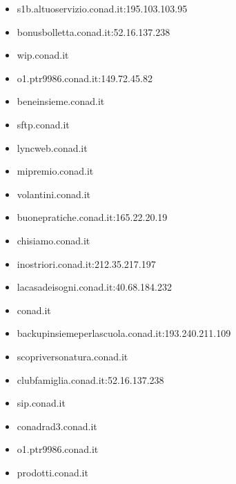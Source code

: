 \documentclass{article}
\begin{document}
\begin{itemize}
        \item s1b.altuoservizio.conad.it:195.103.103.95
    
        \item bonusbolletta.conad.it:52.16.137.238
    
        \item wip.conad.it
    
        \item o1.ptr9986.conad.it:149.72.45.82
    
        \item beneinsieme.conad.it
    
        \item sftp.conad.it
    
        \item lyncweb.conad.it
    
        \item mipremio.conad.it
    
        \item volantini.conad.it
    
        \item buonepratiche.conad.it:165.22.20.19
    
        \item chisiamo.conad.it
    
        \item inostriori.conad.it:212.35.217.197
    
        \item lacasadeisogni.conad.it:40.68.184.232
    
        \item conad.it
    
        \item backupinsiemeperlascuola.conad.it:193.240.211.109
    
        \item scopriversonatura.conad.it
    
        \item clubfamiglia.conad.it:52.16.137.238
    
        \item sip.conad.it
    
        \item conadrad3.conad.it
    
        \item o1.ptr9986.conad.it
    
        \item prodotti.conad.it
    

\end{itemize}
\end{document}

